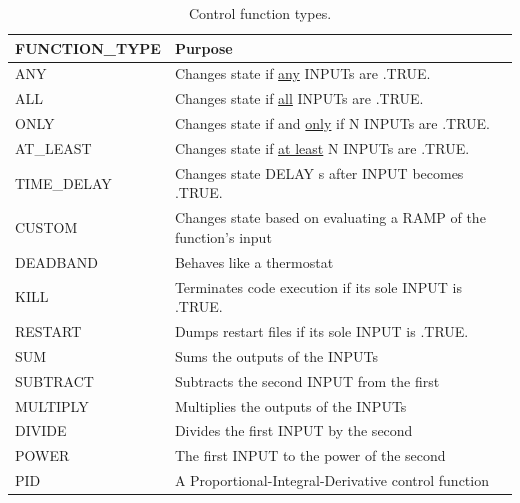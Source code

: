 \documentclass[11pt]{book}
\begin{document}
\begin{table}[h!]
\caption[Control function types]{Control function types.}
\label{tab:funcvalues}
\begin{center}
\begin{tabular}{|l||l|}
\hline
{\ct FUNCTION\_TYPE}              & Purpose   \\ \hline \hline
{\ct ANY}                         & Changes state if \underline{any} {\ct INPUT}s are {\ct .TRUE.}  \\ \hline
{\ct ALL}                         & Changes state if \underline{all} {\ct INPUT}s are {\ct .TRUE.}  \\ \hline
{\ct ONLY}                        & Changes state if and \underline{only} if {\ct N} {\ct INPUT}s are {\ct .TRUE.}  \\ \hline
{\ct AT\_LEAST}                   & Changes state if \underline{at least} {\ct N} {\ct INPUT}s are {\ct .TRUE.}  \\ \hline
{\ct TIME\_DELAY}                 & Changes state {\ct DELAY} s after {\ct INPUT} becomes {\ct .TRUE.} \\ \hline
{\ct CUSTOM}                      & Changes state based on evaluating a {\ct RAMP} of the function's input \\ \hline
{\ct DEADBAND}                    & Behaves like a thermostat  \\ \hline
{\ct KILL}                        & Terminates code execution if its sole {\ct INPUT} is {\ct .TRUE.}  \\ \hline
{\ct RESTART}                     & Dumps restart files if its sole {\ct INPUT} is {\ct .TRUE.} \\ \hline
{\ct SUM}                         & Sums the outputs of the {\ct INPUT}s \\ \hline
{\ct SUBTRACT}                    & Subtracts the second {\ct INPUT} from the first \\ \hline
{\ct MULTIPLY}                    & Multiplies the outputs of the {\ct INPUT}s \\ \hline
{\ct DIVIDE}                      & Divides the first {\ct INPUT} by the second \\ \hline
{\ct POWER}                       & The first {\ct INPUT} to the power of the second \\ \hline
{\ct PID}                         & A Proportional-Integral-Derivative control function \\ \hline
\end{tabular}
\end{center}
\end{table}
\end{document}
